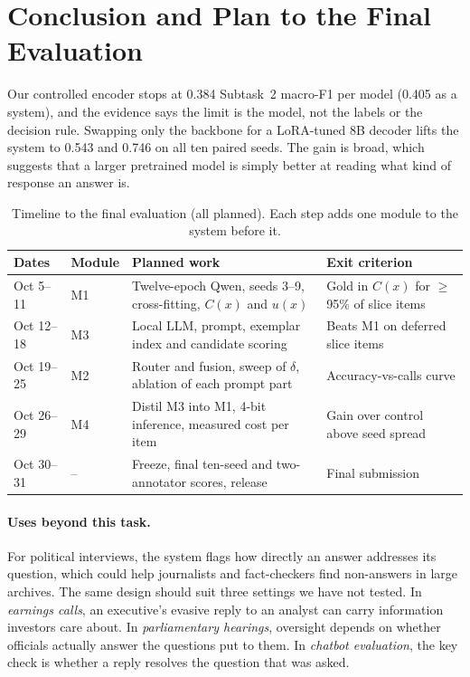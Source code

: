 \section{Conclusion and Plan to the Final Evaluation}
\label{sec:conclusion}

Our controlled encoder stops at 0.384 Subtask~2 macro-F1 per model (0.405 as a system), and the evidence says the limit is the model, not the labels or the decision rule.
Swapping only the backbone for a LoRA-tuned 8B decoder lifts the system to 0.543 and 0.746 on all ten paired seeds.
The gain is broad, which suggests that a larger pretrained model is simply better at reading what kind of response an answer is.

\FigurePlan

\begin{table}[t]
\centering
\small
\begin{tabular}{@{}l l p{} p{}@{}}
\toprule
Dates & Module & Planned work & Exit criterion \\
\midrule
Oct 5--11 & M1 & Twelve-epoch Qwen, seeds 3--9, cross-fitting, $C(x)$ and $u(x)$ & Gold in $C(x)$ for $\ge$95\% of slice items \\
Oct 12--18 & M3 & Local LLM, prompt, exemplar index and candidate scoring & Beats M1 on deferred slice items \\
Oct 19--25 & M2 & Router and fusion, sweep of $\delta$, ablation of each prompt part & Accuracy-vs-calls curve \\
Oct 26--29 & M4 & Distil M3 into M1, 4-bit inference, measured cost per item & Gain over control above seed spread \\
Oct 30--31 & -- & Freeze, final ten-seed and two-annotator scores, release & Final submission \\
\bottomrule
\end{tabular}
\caption{Timeline to the final evaluation (all planned). Each step adds one module to the system before it.}
\label{tab:timeline}
\end{table}

\paragraph{Uses beyond this task.}
For political interviews, the system flags how directly an answer addresses its question, which could help journalists and fact-checkers find non-answers in large archives.
The same design should suit three settings we have not tested.
In \emph{earnings calls}, an executive's evasive reply to an analyst can carry information investors care about.
In \emph{parliamentary hearings}, oversight depends on whether officials actually answer the questions put to them.
In \emph{chatbot evaluation}, the key check is whether a reply resolves the question that was asked.

